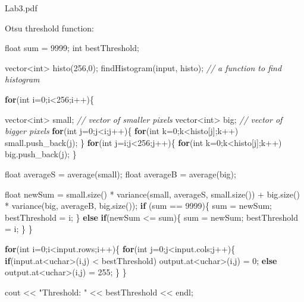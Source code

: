 \documentclass[]{article}
\newenvironment{Shaded}{\begin{snugshade}}{\end{snugshade}}
\newcommand{\KeywordTok}[1]{\textcolor[rgb]{0.13,0.29,0.53}{\textbf{{#1}}}}
\newcommand{\DataTypeTok}[1]{\textcolor[rgb]{0.13,0.29,0.53}{{#1}}}
\newcommand{\DecValTok}[1]{\textcolor[rgb]{0.00,0.00,0.81}{{#1}}}
\newcommand{\StringTok}[1]{\textcolor[rgb]{0.31,0.60,0.02}{{#1}}}
\newcommand{\CommentTok}[1]{\textcolor[rgb]{0.56,0.35,0.01}{\textit{{#1}}}}
\newcommand{\NormalTok}[1]{{#1}}
\begin{document}
Lab3.pdf

Otsu threshold function:

\begin{Shaded}
\begin{Highlighting}[]
\DataTypeTok{float} \NormalTok{sum = }\DecValTok{9999}\NormalTok{;}
    \DataTypeTok{int} \NormalTok{bestThreshold;}
    
    \NormalTok{vector<}\DataTypeTok{int}\NormalTok{> histo(}\DecValTok{256}\NormalTok{,}\DecValTok{0}\NormalTok{);}
    \NormalTok{findHistogram(input, histo); }\CommentTok{// a function to find histogram}
    
    
    \KeywordTok{for}\NormalTok{(}\DataTypeTok{int} \NormalTok{i=}\DecValTok{0}\NormalTok{;i<}\DecValTok{256}\NormalTok{;i++)\{}

        \NormalTok{vector<}\DataTypeTok{int}\NormalTok{> small;  }\CommentTok{// vector of smaller pixels}
        \NormalTok{vector<}\DataTypeTok{int}\NormalTok{> big;    }\CommentTok{// vector of bigger pixels}
        \KeywordTok{for}\NormalTok{(}\DataTypeTok{int} \NormalTok{j=}\DecValTok{0}\NormalTok{;j<i;j++)\{}
            \KeywordTok{for}\NormalTok{(}\DataTypeTok{int} \NormalTok{k=}\DecValTok{0}\NormalTok{;k<histo[j];k++)}
                \NormalTok{small.push_back(j);}
        \NormalTok{\}}
        \KeywordTok{for}\NormalTok{(}\DataTypeTok{int} \NormalTok{j=i;j<}\DecValTok{256}\NormalTok{;j++)\{}
            \KeywordTok{for}\NormalTok{(}\DataTypeTok{int} \NormalTok{k=}\DecValTok{0}\NormalTok{;k<histo[j];k++)}
                \NormalTok{big.push_back(j);}
        \NormalTok{\}}

        \DataTypeTok{float} \NormalTok{averageS = average(small);}
        \DataTypeTok{float} \NormalTok{averageB = average(big);}

        
        \DataTypeTok{float} \NormalTok{newSum = small.size() * variance(small, averageS, small.size()) + big.size() * variance(big, averageB, big.size());}
        \KeywordTok{if} \NormalTok{(sum == }\DecValTok{9999}\NormalTok{)\{}
            \NormalTok{sum = newSum;}
            \NormalTok{bestThreshold = i;}
        \NormalTok{\}}
        \KeywordTok{else} \KeywordTok{if}\NormalTok{(newSum <= sum)\{}
            \NormalTok{sum = newSum;}
            \NormalTok{bestThreshold = i;}
        \NormalTok{\}}
    \NormalTok{\}}

    \KeywordTok{for}\NormalTok{(}\DataTypeTok{int} \NormalTok{i=}\DecValTok{0}\NormalTok{;i<input.rows;i++)\{}
        \KeywordTok{for}\NormalTok{(}\DataTypeTok{int} \NormalTok{j=}\DecValTok{0}\NormalTok{;j<input.cols;j++)\{}
            \KeywordTok{if}\NormalTok{(input.at<}\DataTypeTok{uchar}\NormalTok{>(i,j) < bestThreshold)}
                \NormalTok{output.at<}\DataTypeTok{uchar}\NormalTok{>(i,j) = }\DecValTok{0}\NormalTok{;}
            \KeywordTok{else}
                \NormalTok{output.at<}\DataTypeTok{uchar}\NormalTok{>(i,j) = }\DecValTok{255}\NormalTok{;}
        \NormalTok{\}}
    \NormalTok{\}}

    \NormalTok{cout << }\StringTok{"Threshold: "} \NormalTok{<< bestThreshold << endl;}
\end{Highlighting}
\end{Shaded}
\end{document}
